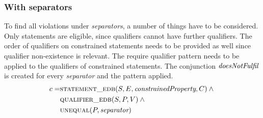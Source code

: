\documentclass[hyperref,bachelorofscience,fleqn]{cgvpub}
\begin{document}
\subsubsection{With separators}\label{subsubsec_single_value_with_separators}
To find all violations under \emph{separators}, a number of things have to be considered. Only statements are eligible, since qualifiers cannot have further qualifiers. The order of qualifiers on constrained statements needs to be provided as well since qualifier non-existence is relevant. The require qualifier pattern needs to be applied to the qualifiers of constrained statements. The conjunction \(\emph{doesNotFulfil}\) is created for every \emph{separator} and the pattern applied.
\begin{equation}
\begin{split}
c = &\textsc{statement\_edb}(S, E, \emph{constrainedProperty}, C) \wedge{} \\
&\textsc{qualifier\_edb}(S, P, V) \wedge{} \\
&\textsc{unequal}(P, \emph{separator})
\end{split}
\end{equation}
\end{document}
